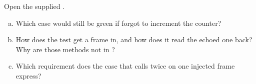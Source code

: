 \label{ex:7:4}
Open the supplied .
\begin{enumerate}[a)]
  \item Which case would still be green if  forgot to increment the counter?
  \item How does the test get a frame in, and how does it read the echoed one back? Why are those
    methods not in ?
  \item Which requirement does the case that calls  twice on one injected frame
    express?
\end{enumerate}

